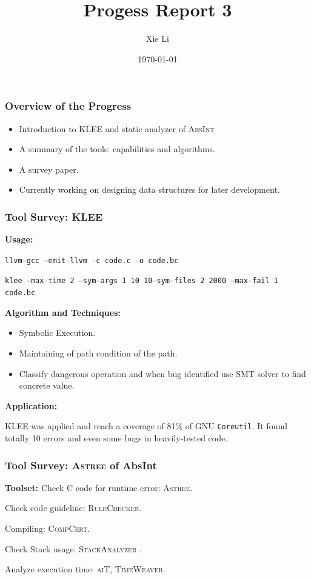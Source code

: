 \documentclass[11pt]{beamer}
\title{Progess Report 3}
\date{\today}
\author{Xie Li}
\begin{document}
\maketitle

\begin{frame}\frametitle{Overview of the Progress}
\begin{itemize}

\item Introduction to \textsc{KLEE} and static analyzer of \textsc{AbsInt}

\item A summary of the tools: capabilities and algorithms.

\item A survey paper.


\item Currently working on designing data structures for later development.
\end{itemize}

\end{frame}

\begin{frame}\frametitle{Tool Survey: \textsc{KLEE}}

\textbf{Usage: }

\texttt{llvm-gcc --emit-llvm -c code.c -o code.bc}


\texttt{klee --max-time 2 --sym-args 1 10 10--sym-files 2 2000 --max-fail 1 code.bc}

\textbf{Algorithm and Techniques:}

\begin{itemize}
\item Symbolic Execution.\\
\item Maintaining of path condition of the path.

\item Classify dangerous operation and when bug identified use SMT solver to find concrete value.
\end{itemize}

\textbf{Application:}

KLEE was applied and reach a coverage of 81\% of GNU \texttt{Coreutil}. It found totally 10 errors and even some bugs in heavily-tested code.
\end{frame}

\begin{frame}\frametitle{Tool Survey: \textsc{Astree} of AbsInt}
\textbf{Toolset:}
Check C code for runtime error: \textsc{Astree}.

Check code guideline: \textsc{RuleChecker}.

Compiling: \textsc{CompCert}.

Check Stack usage: \textsc{StackAnalyzer} 
.

Analyze execution time: \textsc{aiT, TimeWeaver}.

\end{frame}
\end{document}

